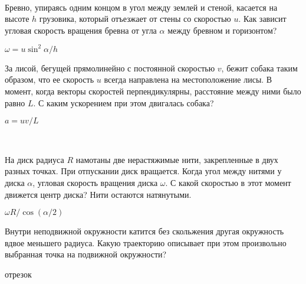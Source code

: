 \begin{ex}
\hspace{0pt} \\
\begin{minipage}{.65\textwidth}
Бревно, упираясь одним концом в угол между землей и стеной, касается на высоте $h$ грузовика, который отъезжает от стены со скоростью $u$. Как зависит угловая скорость вращения бревна от угла $\alpha$ между бревном и горизонтом?
\end{minipage}
\begin{minipage}{.35\textwidth}
\centering

\end{minipage}
\begin{ans}
$\omega = u \sin^2 \alpha /h$
\end{ans}
\end{ex}

\begin{ex}
За лисой, бегущей прямолинейно с постоянной скоростью $v$, бежит собака таким образом, что ее скорость $u$ всегда направлена на местоположение лисы. В момент, когда векторы скоростей перпендикулярны, расстояние между ними было равно $L$. С каким ускорением при этом двигалась собака?
\begin{ans}
$a = uv/L$
\end{ans}
\end{ex}

\begin{ex} 
\hspace{0pt} \\
\begin{minipage}{.65\textwidth}
На диск радиуса $R$ намотаны две нерастяжимые нити, закрепленные в двух разных точках. При отпускании диск вращается. Когда угол между нитями у диска $\alpha$, угловая скорость вращения диска $\omega$. С какой скоростью в этот момент движется центр диска? Нити остаются натянутыми.
\end{minipage}
\begin{minipage}{.35\textwidth}
\centering

\end{minipage}
\begin{ans}
$\omega R/ \cos (\alpha /2)$
\end{ans}
\end{ex}

\begin{ex}
Внутри неподвижной окружности катится без скольжения другая окружность вдвое меньшего радиуса. Какую траекторию описывает при этом произвольно выбранная точка на подвижной окружности?
\begin{ans}
отрезок
\end{ans}
\end{ex}

